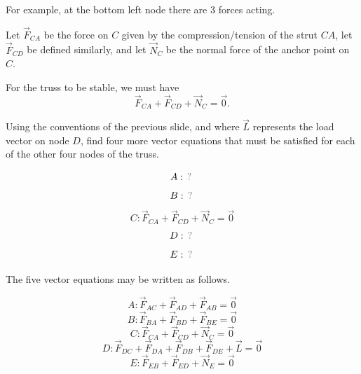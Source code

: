 \begin{applicationActivities}
\begin{remark}
For example, at the bottom left node there are 3 forces acting.

\drawtruss{\trussCForces}

Let \(\vec F_{CA}\) be the force on \(C\) given by the compression/tension
of the strut \(CA\), let \(\vec F_{CD}\) be defined similarly, and let
\(\vec N_C\) be the normal force of the anchor point on \(C\).

\vspace{1em}

For the truss to be stable, we must have
\[
\vec F_{CA}+\vec F_{CD}+\vec N_C=\vec 0
.\]
\end{remark}

\begin{activity}{10}
Using the conventions of the previous slide, and where \(\vec L\)
represents the load vector on node \(D\), find four more vector equations
that must be satisfied for each of the other four nodes of the truss.

\drawtruss

\[
A: \unknown
\]
\[
B: \unknown
\]
\[
C: \vec F_{CA}+\vec F_{CD}+\vec N_C=\vec 0
\]
\[D:\unknown\]
\[E:\unknown\]
\end{activity}

\begin{remark}
The five vector equations may be written as follows.

\drawtruss

\[
A: \vec F_{AC}+\vec F_{AD}+\vec F_{AB}=\vec 0
\]
\[
B: \vec F_{BA}+\vec F_{BD}+\vec F_{BE}=\vec 0
\]
\[
C: \vec F_{CA}+\vec F_{CD}+\vec N_C=\vec 0
\]
\[
D: \vec F_{DC}+\vec F_{DA}+\vec F_{DB} +\vec F_{DE}+\vec L=\vec 0
\]
\[
E: \vec F_{EB}+\vec F_{ED}+\vec N_E=\vec 0
\]
\end{remark}



\end{applicationActivities}
